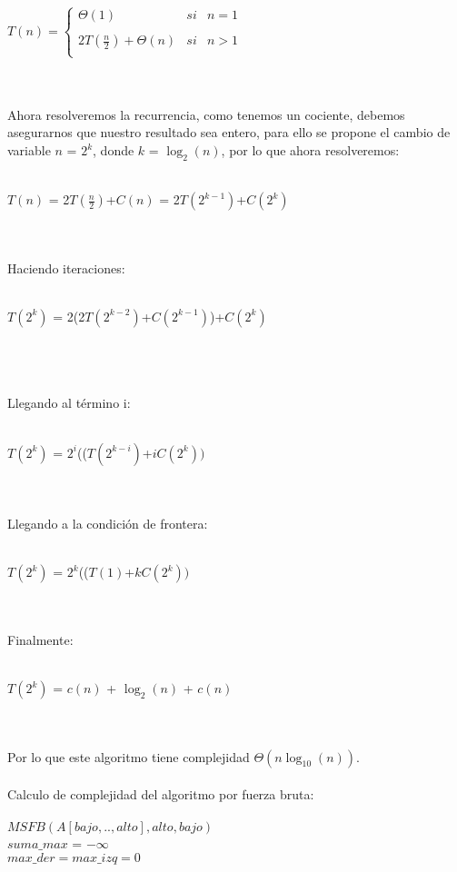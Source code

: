\documentclass[12pt,twoside]{article}
\begin{document}
\centerline{$T(n)= \left\{\begin{array}{lcc}
             \Theta(1) &   si  & n = 1 \\
             \\ 2T(\frac{n}{2}) + \Theta(n) &  si & n > 1\\
             \end{array}
   \right.$}\\\\
Ahora resolveremos la recurrencia, como tenemos un cociente, debemos asegurarnos que nuestro resultado sea entero, para ello se propone el cambio de variable $n$ = $2^{k}$, donde $k$ = $\log_{2}(n)$, por lo que ahora resolveremos:\\\\
\centerline{$T(n)$ = 2$T(\frac{n}{2})$+$C(n)$ = 2$T(2^{k-1})$+$C(2^{k})$}\\\\
Haciendo iteraciones:\\\\
\centerline{$T(2^{k})$ = 2(2$T(2^{k-2})$+$C(2^{k-1})$)+$C(2^{k})$}\\\\\\
Llegando al t\'ermino i:\\\\
\centerline{$T(2^{k})$ = $2^{i}$(($T(2^{k-i})$+$iC(2^{k}))$}\\\\
Llegando a la condici\'on de frontera:\\\\
\centerline{$T(2^{k})$ = $2^{k}$(($T(1)$+$kC(2^{k}))$}\\\\
Finalmente:\\\\
\centerline{$T(2^{k})$ = $c(n)$ + $\log_{2}(n)$ + $c(n)$}\\\\
Por lo que este algoritmo tiene complejidad $\Theta(n\log_{10}(n))$.\\\\
Calculo de complejidad del algoritmo por fuerza bruta:\\\\
\hspace*{1cm}$MSFB(A[bajo,..,alto],alto,bajo)$\\
\hspace*{2cm}$suma\_max$ = $-\infty$\\
\hspace*{2cm}$max\_der = max\_izq = 0$\\
\end{document}
